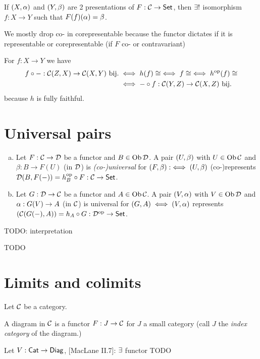 \documentclass[a4paper]{report}
\begin{document}
\begin{prop}[analog of 32] If $(X, \alpha)$ and $(Y, \beta)$ are 2 presentations of $F: \mathcal{C} \to \mathsf{Set}$, then $\exists!$ isomorphism $f: X \to Y$ such that $F(f)(\alpha) = \beta$.
\end{prop}
\begin{rem*}
We mostly drop co- in corepresentable because the functor dictates if it is representable or corepresentable (if $F$ co- or contravariant)
\end{rem*}
\begin{rem*}
  For $f: X \to Y$ we have
  \begin{align*}
    f \circ -  : \mathcal{C}(Z,X) \to \mathcal{C}(X,Y) \text{ bij.} &\iff h(f) \cong \iff f \cong \iff h^\mathrm{op}(f) \cong \\&\iff -\circ f : \mathcal{C}(Y,Z) \to \mathcal{C}(X,Z) \text{ bij.}
  \end{align*} because $h$ is fully faithful.

\end{rem*}

\section{Universal pairs}
\begin{defi}
\begin{enumerate}[(a)]
  \item Let $F: \mathcal{C} \to \mathcal{D}$ be a functor and $B \in \operatorname{Ob} \mathcal{D}$. A pair $(U, \beta)$ with $U \in \operatorname{Ob} \mathcal{C}$ and $\beta: B \to F(U)$ (in $\mathcal{D}$) is \emph{(co-)universal} for $(F, \beta):\iff (U,\beta)$ (co-)represents $\mathcal{D}(B, F(-)) = h_{B}^\mathrm{op} \circ F: \mathcal{C} \to \mathsf{Set}$.
  \item Let $G: \mathcal{D} \to \mathcal{C}$ be a functor and $A \in \operatorname{Ob} \mathcal{C}$. A pair $(V, \alpha)$ with $V \in \operatorname{Ob} \mathcal{D}$ and $\alpha : G(V) \to A$ (in $\mathcal{C}$) is universal for $(G, A) \iff (V, \alpha)$ represents $(\mathcal{C}(G(-), A)) = h_{A} \circ G: \mathcal{D}^\mathrm{op} \to \mathsf{Set}$.
\end{enumerate}
TODO: interpretation
\end{defi}
\begin{exmps}
\begin{enumerate}[(a)]
TODO
\end{enumerate}

\end{exmps}

\section{Limits and colimits}
Let $\mathcal{C}$ be a category.
\begin{defi}
  A diagram in $\mathcal{C}$ is a functor $F: J \to \mathcal{C}$ for $J$ a small category (call $J$ the \emph{index category} of the diagram.)
\end{defi}
\begin{rem*}Let $V: \mathsf{Cat} \to \mathsf{Diag}$, [MacLane II.7]: $\exists$ functor TODO

\end{rem*}
\end{document}
